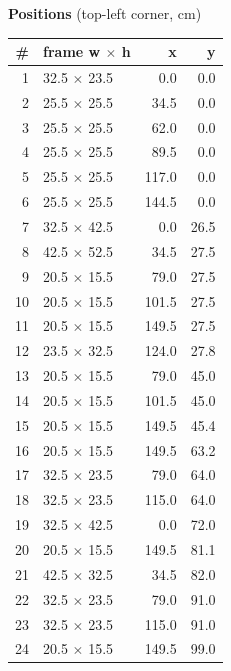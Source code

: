 \documentclass[a4paper,landscape,10pt]{article}
\begin{document}
\begin{minipage}[t]{0.25\textwidth}
\vspace{8pt}
{\bfseries Positions} (top-left corner, cm)\\[2pt]
\tiny
\begin{tabular}{@{}r l r r@{}}
\toprule
\# & frame w $\times$ h & x & y \\
\midrule
1 & 32.5 $\times$ 23.5 & 0.0 & 0.0 \\
2 & 25.5 $\times$ 25.5 & 34.5 & 0.0 \\
3 & 25.5 $\times$ 25.5 & 62.0 & 0.0 \\
4 & 25.5 $\times$ 25.5 & 89.5 & 0.0 \\
5 & 25.5 $\times$ 25.5 & 117.0 & 0.0 \\
6 & 25.5 $\times$ 25.5 & 144.5 & 0.0 \\
7 & 32.5 $\times$ 42.5 & 0.0 & 26.5 \\
8 & 42.5 $\times$ 52.5 & 34.5 & 27.5 \\
9 & 20.5 $\times$ 15.5 & 79.0 & 27.5 \\
10 & 20.5 $\times$ 15.5 & 101.5 & 27.5 \\
11 & 20.5 $\times$ 15.5 & 149.5 & 27.5 \\
12 & 23.5 $\times$ 32.5 & 124.0 & 27.8 \\
13 & 20.5 $\times$ 15.5 & 79.0 & 45.0 \\
14 & 20.5 $\times$ 15.5 & 101.5 & 45.0 \\
15 & 20.5 $\times$ 15.5 & 149.5 & 45.4 \\
16 & 20.5 $\times$ 15.5 & 149.5 & 63.2 \\
17 & 32.5 $\times$ 23.5 & 79.0 & 64.0 \\
18 & 32.5 $\times$ 23.5 & 115.0 & 64.0 \\
19 & 32.5 $\times$ 42.5 & 0.0 & 72.0 \\
20 & 20.5 $\times$ 15.5 & 149.5 & 81.1 \\
21 & 42.5 $\times$ 32.5 & 34.5 & 82.0 \\
22 & 32.5 $\times$ 23.5 & 79.0 & 91.0 \\
23 & 32.5 $\times$ 23.5 & 115.0 & 91.0 \\
24 & 20.5 $\times$ 15.5 & 149.5 & 99.0 \\
\bottomrule
\end{tabular}
\end{minipage}
\clearpage
\end{document}
